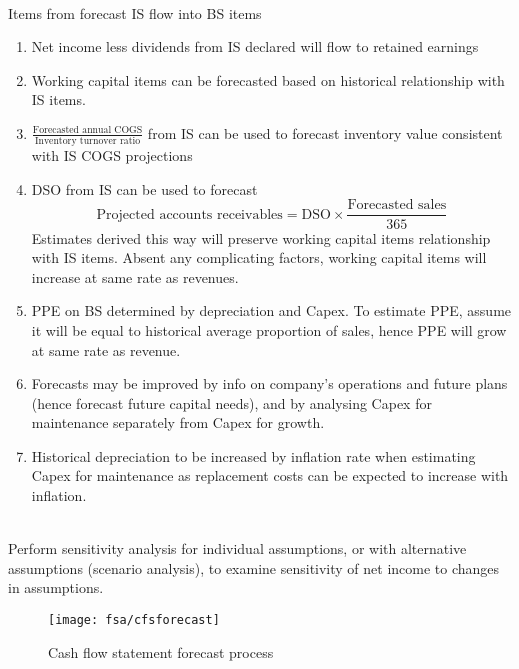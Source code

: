 \begin{remark} \\
Items from forecast IS flow into BS items
\begin{enumerate}[label=\roman*.]
\setlength{\itemsep}{0pt}
\item Net income less dividends from IS declared will flow to retained earnings
\item Working capital items can be forecasted based on historical relationship with IS items.
\item $\frac{\text{Forecasted annual COGS}}{\text{Inventory turnover ratio}}$ from IS can be used to forecast inventory value consistent with IS COGS projections
\item DSO from IS can be used to forecast
\begin{equation}
\text{Projected accounts receivables} = \text{DSO} \times \frac{\text{Forecasted sales}}{365} \nonumber
\end{equation}
Estimates derived this way will preserve working capital items relationship with IS items. Absent any complicating factors, working capital items will increase at same rate as revenues.
\item PPE on BS determined by depreciation and Capex. To estimate PPE, assume it will be equal to historical average proportion of sales, hence PPE will grow at same rate as revenue.
\item Forecasts may be improved by info on company's operations and future plans (hence forecast future capital needs), and by analysing Capex for maintenance separately from Capex for growth.
\item Historical depreciation to be increased by inflation rate when estimating Capex for maintenance as replacement costs can be expected to increase with inflation.
\end{enumerate}
\end{remark}

\begin{remark} \\
Perform sensitivity analysis for individual assumptions, or with alternative assumptions (scenario analysis), to examine sensitivity of net income to changes in assumptions.
\end{remark}

\begin{figure}[H]
\centering
\texttt{[image: fsa/cfsforecast]}
\caption{Cash flow statement forecast process}
\end{figure}

